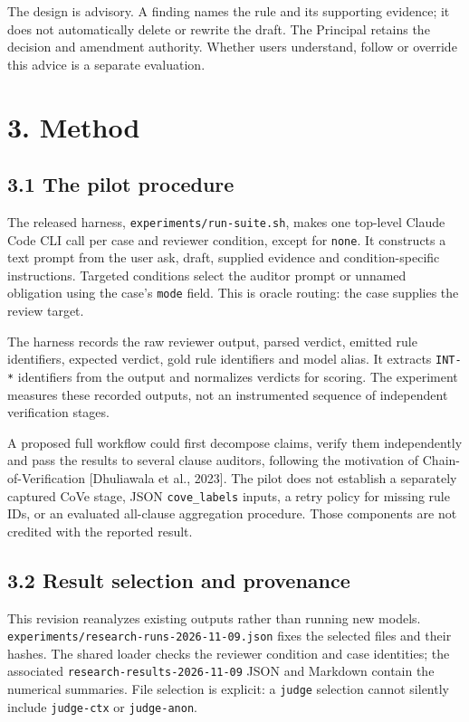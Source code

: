 \documentclass[
  10pt,
  a4paper,
]{article}
\begin{document}
The design is advisory. A finding names the rule and its supporting
evidence; it does not automatically delete or rewrite the draft. The
Principal retains the decision and amendment authority. Whether users
understand, follow or override this advice is a separate evaluation.

\section{3. Method}\label{method}

\subsection{3.1 The pilot procedure}\label{the-pilot-procedure}

The released harness, \texttt{experiments/run-suite.sh}, makes one
top-level Claude Code CLI call per case and reviewer condition, except
for \texttt{none}. It constructs a text prompt from the user ask, draft,
supplied evidence and condition-specific instructions. Targeted
conditions select the auditor prompt or unnamed obligation using the
case's \texttt{mode} field. This is oracle routing: the case supplies
the review target.

The harness records the raw reviewer output, parsed verdict, emitted
rule identifiers, expected verdict, gold rule identifiers and model
alias. It extracts \texttt{INT-*} identifiers from the output and
normalizes verdicts for scoring. The experiment measures these recorded
outputs, not an instrumented sequence of independent verification
stages.

A proposed full workflow could first decompose claims, verify them
independently and pass the results to several clause auditors, following
the motivation of Chain-of-Verification {[}Dhuliawala et al., 2023{]}.
The pilot does not establish a separately captured CoVe stage, JSON
\texttt{cove\_labels} inputs, a retry policy for missing rule IDs, or an
evaluated all-clause aggregation procedure. Those components are not
credited with the reported result.

\subsection{3.2 Result selection and
provenance}\label{result-selection-and-provenance}

This revision reanalyzes existing outputs rather than running new
models. \texttt{experiments/research-runs-2026-11-09.json} fixes the
selected files and their hashes. The shared loader checks the reviewer
condition and case identities; the associated
\texttt{research-results-2026-11-09} JSON and Markdown contain the
numerical summaries. File selection is explicit: a \texttt{judge}
selection cannot silently include \texttt{judge-ctx} or
\texttt{judge-anon}.
\end{document}
